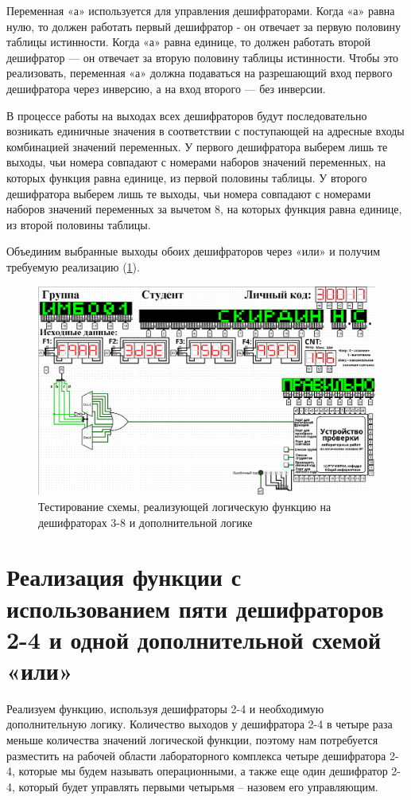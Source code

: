 \documentclass[14pt, a4paper]{extreport}
\begin{document}
Переменная «а» используется для управления дешифраторами. Когда «а» равна нулю, то должен работать первый дешифратор - он отвечает за первую половину таблицы истинности. Когда «а» равна единице, то должен работать второй дешифратор — он отвечает за вторую половину таблицы истинности. Чтобы это реализовать, переменная «а» должна подаваться на разрешающий вход первого дешифратора через инверсию, а на вход второго — без инверсии.

В процессе работы на выходах всех дешифраторов будут последовательно возникать единичные значения в соответствии с поступающей на адресные входы комбинацией значений переменных. У первого дешифратора выберем лишь те выходы, чьи номера совпадают с номерами наборов значений переменных, на которых функция равна единице, из первой половины таблицы. У второго дешифратора выберем лишь те выходы, чьи номера совпадают с номерами наборов значений переменных за вычетом 8, на которых функция равна единице, из второй половины таблицы.

Объединим выбранные выходы обоих дешифраторов через «или» и получим требуемую реализацию (\cref{fig:decoder-3-8}).
\begin{figure}[H]
	\caption{Тестирование схемы, реализующей логическую функцию на дешифраторах 3-8 и дополнительной логике}
	\label{fig:decoder-3-8}
	\includegraphics[width=\textwidth]{decoder-3-8}
\end{figure}

\section{Реализация функции с использованием пяти дешифраторов 2-4 и одной дополнительной схемой «или»}
Реализуем функцию, используя дешифраторы 2-4 и необходимую дополнительную логику. Количество выходов у дешифратора 2-4 в четыре раза меньше количества значений логической функции, поэтому нам потребуется разместить на рабочей области лабораторного комплекса четыре дешифратора 2-4, которые мы будем называть операционными, а также еще один дешифратор 2-4, который будет управлять первыми четырьмя – назовем его управляющим.
\end{document}
